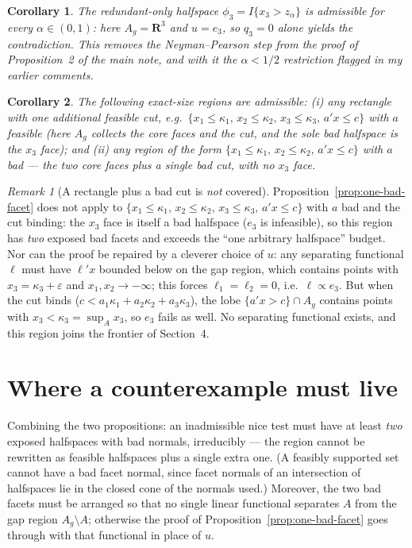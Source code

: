 \documentclass[12pt]{article}
\newtheorem{corollary}{Corollary}
\theoremstyle{remark}
\newtheorem{remark}{Remark}
\newcommand{\R}{\mathbf R}
\begin{document}
\begin{corollary}
The redundant-only halfspace $\phi_3=I\{x_3>z_\alpha\}$ is admissible for
every $\alpha\in(0,1)$: here $A_g=\R^3$ and $u=e_3$, so
$q_3=0$ alone yields the contradiction. This removes the
Neyman--Pearson step from the proof of Proposition~2 of the main note, and
with it the $\alpha<1/2$ restriction flagged in my earlier comments.
\end{corollary}

\begin{corollary}\label{cor:one-cut}
The following exact-size regions are admissible: (i) any rectangle with one
additional \emph{feasible} cut, e.g.\
$\{x_1\le\kappa_1,\,x_2\le\kappa_2,\,x_3\le\kappa_3,\,a'x\le c\}$ with $a$
feasible (here $A_g$ collects the core faces and the cut, and the sole bad
halfspace is the $x_3$ face); and (ii) any region of the form
$\{x_1\le\kappa_1,\,x_2\le\kappa_2,\,a'x\le c\}$ with $a$ bad --- the two
core faces plus a single bad cut, with no $x_3$ face.
\end{corollary}

\begin{remark}[A rectangle plus a bad cut is \emph{not} covered]
\label{rem:not-covered}
Proposition~\ref{prop:one-bad-facet} does not apply to
$\{x_1\le\kappa_1,\,x_2\le\kappa_2,\,x_3\le\kappa_3,\,a'x\le c\}$ with $a$
bad and the cut binding: the $x_3$ face is itself a bad halfspace ($e_3$ is
infeasible), so this region has \emph{two} exposed bad facets and exceeds
the ``one arbitrary halfspace'' budget. Nor can the proof be repaired by a
cleverer choice of $u$: any separating functional $\ell$ must have
$\ell'x$ bounded below on the gap region, which contains points with
$x_3=\kappa_3+\varepsilon$ and $x_1,x_2\to-\infty$; this forces
$\ell_1=\ell_2=0$, i.e.\ $\ell\propto e_3$. But when the cut binds
($c<a_1\kappa_1+a_2\kappa_2+a_3\kappa_3$), the lobe $\{a'x>c\}\cap A_g$
contains points with $x_3<\kappa_3=\sup_Ax_3$, so $e_3$ fails as well. No
separating functional exists, and this region joins the frontier of
Section~4.
\end{remark}

\section{Where a counterexample must live}

Combining the two propositions: an inadmissible nice test must have at least
\emph{two} exposed halfspaces with bad normals, irreducibly --- the region
cannot be rewritten as feasible halfspaces plus a single extra one. (A
feasibly supported set cannot have a bad facet normal, since facet normals
of an intersection of halfspaces lie in the closed cone of the normals
used.) Moreover, the two bad facets must be arranged so that no single
linear functional separates $A$ from the gap region $A_g\setminus A$;
otherwise the proof of Proposition~\ref{prop:one-bad-facet} goes through
with that functional in place of $u$.
\end{document}
